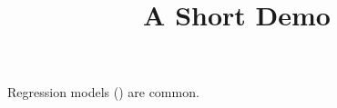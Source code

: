 \documentclass[article]{jss}
\title{A Short Demo}
\begin{document}
Regression models (\cite{Cameron+Trivedi:2013}) are common.
\end{document}
